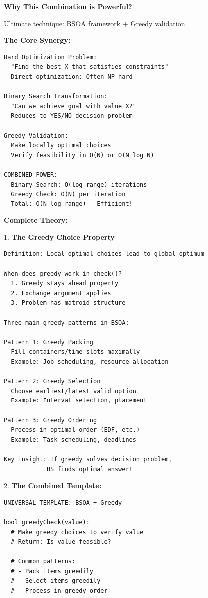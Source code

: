 \documentclass[11pt,a4paper,oneside]{book}
\begin{document}
\begin{tcolorbox}[
    enhanced,breakable,
    colback=white,
    colframe=deepblue,
    boxrule=1.5pt,
    arc=3mm,
    title=\textbf{The Synergy of BS and Greedy}
]
\textbf{Why This Combination is Powerful?}

Ultimate technique: BSOA framework + Greedy validation

\textbf{The Core Synergy:}
\begin{verbatim}
Hard Optimization Problem:
  "Find the best X that satisfies constraints"
  Direct optimization: Often NP-hard
  
Binary Search Transformation:
  "Can we achieve goal with value X?"
  Reduces to YES/NO decision problem
  
Greedy Validation:
  Make locally optimal choices
  Verify feasibility in O(N) or O(N log N)
  
COMBINED POWER:
  Binary Search: O(log range) iterations
  Greedy Check: O(N) per iteration
  Total: O(N log range) - Efficient!
\end{verbatim}

\textbf{Complete Theory:}

1. \textbf{The Greedy Choice Property}
\begin{verbatim}
Definition: Local optimal choices lead to global optimum

When does greedy work in check()?
  1. Greedy stays ahead property
  2. Exchange argument applies
  3. Problem has matroid structure

Three main greedy patterns in BSOA:

Pattern 1: Greedy Packing
  Fill containers/time slots maximally
  Example: Job scheduling, resource allocation
  
Pattern 2: Greedy Selection
  Choose earliest/latest valid option
  Example: Interval selection, placement
  
Pattern 3: Greedy Ordering
  Process in optimal order (EDF, etc.)
  Example: Task scheduling, deadlines

Key insight: If greedy solves decision problem,
            BS finds optimal answer!
\end{verbatim}

2. \textbf{The Combined Template:}
\begin{verbatim}
UNIVERSAL TEMPLATE: BSOA + Greedy

bool greedyCheck(value):
  # Make greedy choices to verify value
  # Return: Is value feasible?
  
  # Common patterns:
  # - Pack items greedily
  # - Select items greedily
  # - Process in greedy order
  

\end{verbatim}
\end{tcolorbox}
\end{document}
